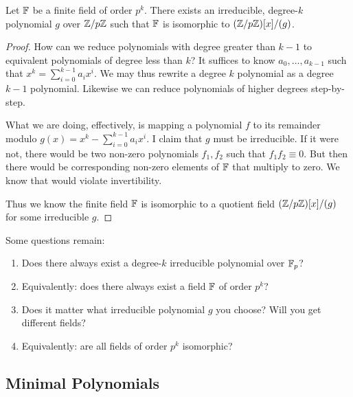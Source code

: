 \begin{theorem}
  Let $\mathbb{F}$ be a finite field of order $p^k$. There exists an
  irreducible, degree-$k$ polynomial $g$ over $\mathbb{Z} / p\mathbb{Z}$ such that $\mathbb{F}$ is
  isomorphic to $\mathopen{}\left( {\mathbb{Z} / p\mathbb{Z}} \right)\mathclose{}[x]/(g)$.
\end{theorem}

\begin{proof}
  How can we reduce polynomials with degree greater than $k-1$ to
  equivalent polynomials of degree less than $k$? It suffices to know
  $a_0, \ldots, a_{k-1}$ such that $x^k = \sum_{i=0}^{k-1} a_i x^i$. We
  may thus rewrite a degree $k$ polynomial as a degree $k-1$ polynomial.
  Likewise we can reduce polynomials of higher degrees step-by-step.

  What we are doing, effectively, is mapping a polynomial $f$ to its
  remainder modulo $g(x) = x^k - \sum_{i=0}^{k-1} a_i x^i$. I claim that
  $g$ must be irreducible. If it were not, there would be two non-zero
  polynomials $f_1, f_2$ such that $f_1 f_2 \equiv 0$. But then there
  would be corresponding non-zero elements of $\mathbb{F}$ that multiply to
  zero. We know that would violate invertibility.

  Thus we know the finite field $\mathbb{F}$ is isomorphic to a quotient field
  $\mathopen{}\left( {\mathbb{Z} / p\mathbb{Z}} \right)\mathclose{}[x]/(g)$ for some irreducible $g$.
\end{proof}

\begin{remark}
  Some questions remain:

  \begin{enumerate}
    \item Does there always exist a degree-$k$ irreducible polynomial
    over $\mathbb{F}_p$?

    \item Equivalently: does there always exist a field $\mathbb{F}$ of order
    $p^k$?

    \item Does it matter what irreducible polynomial $g$ you choose?
    Will you get different fields?

    \item Equivalently: are all fields of order $p^k$ isomorphic?
  \end{enumerate}
\end{remark}

\subsection{Minimal Polynomials}

